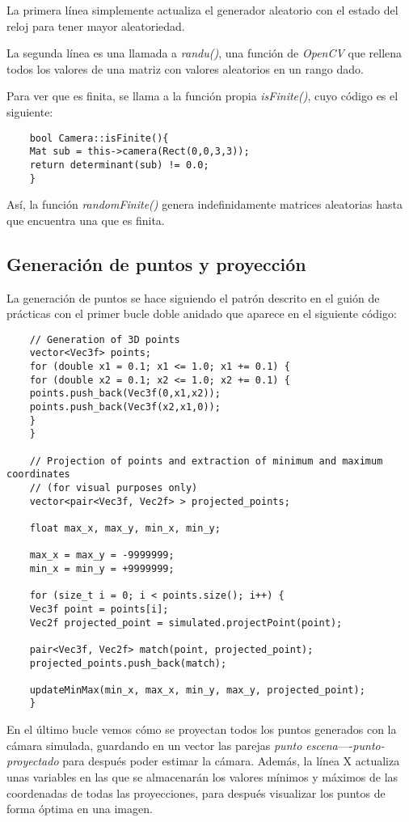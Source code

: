 \documentclass[a4paper, 11pt]{article}
\theoremstyle{definition}
\theoremstyle{theorem}
\begin{document}
    La primera línea simplemente actualiza el generador aleatorio con el estado del reloj para tener mayor aleatoriedad.

    La segunda línea es una llamada a \emph{randu()}, una función de \emph{OpenCV} que rellena todos los valores de una matriz con valores aleatorios en un rango dado.

    Para ver que es finita, se llama a la función propia \emph{isFinite()}, cuyo código es el siguiente:

    \begin{lstlisting}
    bool Camera::isFinite(){
    Mat sub = this->camera(Rect(0,0,3,3));
    return determinant(sub) != 0.0;
    }
    \end{lstlisting}

    Así, la función \emph{randomFinite()} genera indefinidamente matrices aleatorias hasta que encuentra una que es finita.

    \subsection{Generación de puntos y proyección}
    La generación de puntos se hace siguiendo el patrón descrito en el guión de prácticas con el primer bucle doble anidado que aparece en el siguiente código:

    \begin{lstlisting}
    // Generation of 3D points
    vector<Vec3f> points;
    for (double x1 = 0.1; x1 <= 1.0; x1 += 0.1) {
    for (double x2 = 0.1; x2 <= 1.0; x2 += 0.1) {
    points.push_back(Vec3f(0,x1,x2));
    points.push_back(Vec3f(x2,x1,0));
    }
    }

    // Projection of points and extraction of minimum and maximum coordinates
    // (for visual purposes only)
    vector<pair<Vec3f, Vec2f> > projected_points;

    float max_x, max_y, min_x, min_y;

    max_x = max_y = -9999999;
    min_x = min_y = +9999999;

    for (size_t i = 0; i < points.size(); i++) {
    Vec3f point = points[i];
    Vec2f projected_point = simulated.projectPoint(point);

    pair<Vec3f, Vec2f> match(point, projected_point);
    projected_points.push_back(match);

    updateMinMax(min_x, max_x, min_y, max_y, projected_point);
    }
    \end{lstlisting}

    En el último bucle vemos cómo se proyectan todos los puntos generados con la cámara simulada, guardando en un vector las parejas \emph{punto escena}----\emph{punto-proyectado} para después poder estimar la cámara. Además, la línea X actualiza unas variables en las que se almacenarán los valores mínimos y máximos de las coordenadas de todas las proyecciones, para después visualizar los puntos de forma óptima en una imagen.
\end{document}
